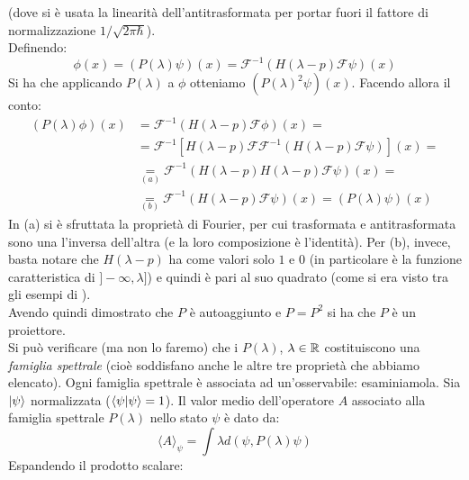 \documentclass[../../FisicaTeorica.tex]{subfiles}
\begin{document}
(dove si è usata la linearità dell'antitrasformata per portar fuori il fattore di normalizzazione $1/\sqrt{2\pi\hbar}$).\\
Definendo:
\[
\phi(x) = (P(\lambda)\psi)(x) = \mathcal{F}^{-1}(H(\lambda-p)\mathcal{F}\psi)(x)
\]
Si ha che applicando $P(\lambda)$ a $\phi$ otteniamo $(P(\lambda)^2\psi)(x)$. Facendo allora il conto:
\begin{align*}
    (P(\lambda)\phi)(x) &= \mathcal{F}^{-1}(H(\lambda-p)\mathcal{F}\phi)(x) =\\
    &= \mathcal{F}^{-1}[H(\lambda-p) \mathcal{F}\mathcal{F}^{-1}(H(\lambda-p)\mathcal{F}\psi)](x) =\\
    &\underset{(a)}{=} \mathcal{F}^{-1}(H(\lambda-p)H(\lambda-p)\mathcal{F}\psi)(x) =\\
    &\underset{(b)}{=} \mathcal{F}^{-1}(H(\lambda-p)\mathcal{F}\psi)(x) = (P(\lambda)\psi)(x)
\end{align*}
In (a) si è sfruttata la proprietà di Fourier, per cui trasformata e antitrasformata sono una l'inversa dell'altra (e la loro composizione è l'identità). Per (b), invece, basta notare che $H(\lambda-p)$ ha come valori solo $1$ e $0$ (in particolare è la funzione caratteristica di $]-\infty, \lambda]$) e quindi è pari al suo quadrato (come si era visto tra gli esempi di ).\\
Avendo quindi dimostrato che $P$ è autoaggiunto e $P=P^2$ si ha che $P$ è un proiettore.\\
Si può verificare (ma non lo faremo) che i $P(\lambda)$, $\lambda \in \mathbb{R}$ costituiscono una \textit{famiglia spettrale} (cioè soddisfano anche le altre tre proprietà che abbiamo elencato). Ogni famiglia spettrale è associata ad un'osservabile: esaminiamola.
Sia $\ket{\psi}$ normalizzata ($\braket{\psi|\psi} = 1$). Il valor medio dell'operatore $A$ associato alla famiglia spettrale $P(\lambda)$ nello stato $\psi$ è dato da:
\begin{equation}
\langle A \rangle_\psi = \int \lambda d(\psi, P(\lambda)\psi)
\label{eqn:valormediop}
\end{equation}
Espandendo il prodotto scalare: 
\end{document}
